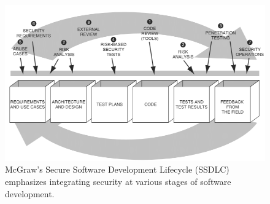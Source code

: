 \documentclass[9pt]{extarticle}
\begin{document}
\newpage
\begin{figure}[h]
    \begin{center}
        \includegraphics[width=0.5\linewidth]{images/McGraws-Secure-Software-Development-Life-Cycle-Process.png}
    \caption{McGraw's Secure Software Development Lifecycle (SSDLC) emphasizes integrating security at various stages of software development.}
    \end{center}
\end{figure}
\end{document}
